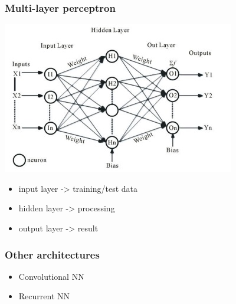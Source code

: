 \documentclass[xcolor=table]{beamer}
\begin{document}
\begin{mdframe}%

\frametitle{Multi-layer perceptron}\label{heading-sec-multi-layer-perceptron}%

\noindent{}\includegraphics[keepaspectratio=true,width=\dimmin{}{\dimwidth{0.90}}]{images/multiperc}{}%

\begin{itemize}%

\item{}
input layer -\textgreater{} training/test data%

\item{}
hidden layer -\textgreater{} processing%

\item{}
output layer -\textgreater{} result%
\end{itemize}%
\end{mdframe}\label{sec-multi-layer-perceptron}%

\begin{mdframe}%

\frametitle{Other architectures}\label{heading-sec-other-architectures}%

\begin{itemize}%

\item{}
Convolutional NN%

\item{}
Recurrent NN%
\end{itemize}%
\end{mdframe}\label{sec-other-architectures}%
\end{document}
